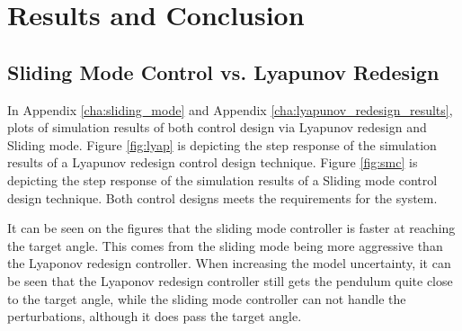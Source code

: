 \section{Results and Conclusion} %
\label{sec:results_and_conclusion}

\subsection{Sliding Mode Control vs. Lyapunov Redesign} %
\label{sub:sliding_mode_control_vs_lyapunov_redesign}
In Appendix \ref{cha:sliding_mode} and Appendix \ref{cha:lyapunov_redesign_results}, plots of simulation results of both
control design via Lyapunov redesign and Sliding mode. Figure \ref{fig:lyap} is depicting the step response of the
simulation results of a Lyapunov redesign control design technique. Figure \ref{fig:smc} is depicting the step response
of the simulation results of a Sliding mode control design technique. Both control designs meets the requirements for the
system.

It can be seen on the figures that the sliding mode controller is faster at reaching the target angle. This comes from the sliding mode being more aggressive
than the Lyaponov redesign controller. When increasing the model uncertainty, it can be seen that the Lyaponov redesign controller still gets the pendulum quite close to the target angle, while the sliding mode controller can not handle the perturbations, although it does pass the target angle.